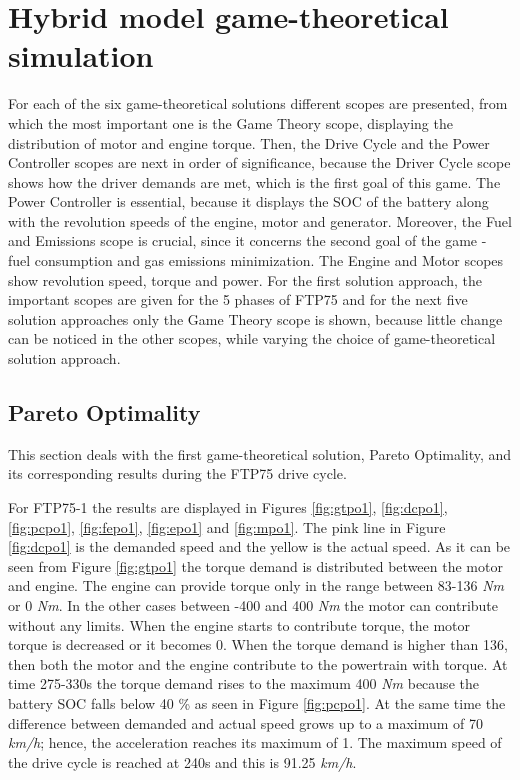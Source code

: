 \section{Hybrid model game-theoretical simulation}

For each of the six game-theoretical solutions different scopes are presented, from which the most important one is the Game Theory scope, displaying the distribution of motor and engine torque. Then, the Drive Cycle and the Power Controller scopes are next in order of significance, because the Driver Cycle scope shows how the driver demands are met, which is the first goal of this game. The Power Controller is essential, because it displays the SOC of the battery along with the revolution speeds of the engine, motor and generator. Moreover, the Fuel and Emissions scope is crucial, since it concerns the second goal of the game - fuel consumption and gas emissions minimization. The Engine and Motor scopes show revolution speed, torque and power. For the first solution approach, the important scopes are given for the 5 phases of FTP75 and for the next five solution approaches only the Game Theory scope is shown, because little change can be noticed in the other scopes, while varying the choice of game-theoretical solution approach.

\subsection{Pareto Optimality}
This section deals with the first game-theoretical solution, Pareto Optimality, and its corresponding results during the FTP75 drive cycle. 

For FTP75-1 the results are displayed in Figures \ref{fig:gtpo1}, \ref{fig:dcpo1}, \ref{fig:pcpo1}, \ref{fig:fepo1}, \ref{fig:epo1} and \ref{fig:mpo1}. The pink line in Figure \ref{fig:dcpo1} is the demanded speed and the yellow is the actual speed. As it can be seen from Figure \ref{fig:gtpo1} the torque demand is distributed between the motor and engine. The engine can provide torque only in the range between 83-136 \textit{Nm} or 0 \textit{Nm}. In the other cases between -400 and 400 \textit{Nm} the motor can contribute without any limits. When the engine starts to contribute torque, the motor torque is decreased or it becomes 0. When the torque demand is higher than 136, then both the motor and the engine contribute to the powertrain with torque. At time 275-330s the torque demand rises to the maximum 400 \textit{Nm} because the battery SOC falls below 40 \% as seen in Figure \ref{fig:pcpo1}. At the same time the difference between demanded and actual speed grows up to a maximum of 70 \textit{km/h}; hence, the acceleration reaches its maximum of 1. The maximum speed of the drive cycle is reached at 240s and this is 91.25 \textit{km/h}. 

